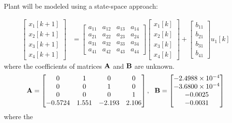 Plant will be modeled using a state-space approach:

\begin{align}
  \label{eq:statespaceModel}
\begin{bmatrix}
    x_1[k+1] \\
    x_2[k+1] \\
    x_3[k+1] \\
    x_4[k+1]
\end{bmatrix}&=
\begin{bmatrix}
  a_{11} &  a_{12}&  a_{13}&  a_{14}\\
  a_{21} &  a_{22}&  a_{23}&  a_{24}\\  
  a_{31} &  a_{32}&  a_{33}&  a_{34}\\  
  a_{41} &  a_{42}&  a_{43}&  a_{44}
\end{bmatrix} 
\begin{bmatrix}
  x_1[k] \\
  x_2[k] \\
  x_3[k] \\
  x_4[k]
  \end{bmatrix}                             
+
\begin{bmatrix}
    b_{11}\\
    b_{21}\\
    b_{31}\\
    b_{41}
\end{bmatrix}
u_1[k] 
\end{align}
%
where the coefficients of matrices ${\bf A}$ and ${\bf B}$ are unknown.
%
\begin{align*}
{\bf A}=
\begin{bmatrix}
  0 &  1 & 0 & 0\\
  0 &  0 & 1 & 0\\  
  0 &  0 & 0 & 1\\  
  -0.5724 & 1.551 & -2.193 & 2.106
\end{bmatrix},~~ 
{\bf B}=
\begin{bmatrix}
    -2.4988\times 10^{-4}\\
    -3.6800\times 10^{-4}\\
    -0.0025\\
    -0.0031
\end{bmatrix} 
\end{align*}
%
where the 

